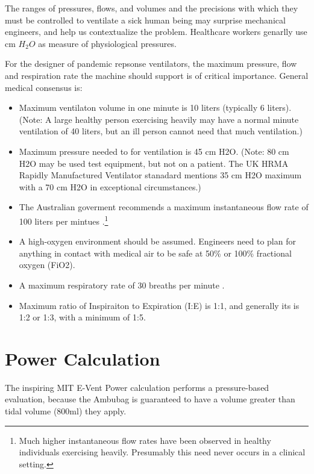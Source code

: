\documentclass[conference]{article}
\begin{document}
The ranges of pressures, flows, and volumes and the precisions with which
they must be controlled to ventilate a sick human being may surprise
mechanical engineers, and help us contextualize the problem.
Healthcare workers genarlly use cm $H_2O$ as measure of physiological
pressures.

For the designer of pandemic repsonse ventilators, the maximum pressure,
flow and respiration rate the machine should support is of critical importance.
General medical consensus is:
\begin{itemize}
\item Maximum ventilaton volume in one minute is 10 liters (typically 6 liters).
  (Note: A large healthy person exercising heavily may have a normal minute ventilation of 40 liters, but an ill person cannot need that much ventilation.)
\item Maximum pressure needed to for ventilation is 45 cm H2O\cite{de2012large,bein2016standard,australiarequirement}.
  (Note: 80 cm H2O may be used test equipment, but not on a patient.
  The UK HRMA Rapidly Manufactured Ventilator stanadard mentions 35 cm H2O maximum with a 70 cm H2O in exceptional circumstances\cite{rmvs}.)
\item The Australian goverment recommends a maximum instantaneous flow rate of 100 liters per mintues \cite{australiarequirement}.\footnote{Much higher instantaneous flow rates have been observed in healthy individuals exercising heavily. Presumably this need never occurs in a clinical setting.}
\item A high-oxygen environment should be assumed. Engineers need to plan for anything
  in contact with medical air to be safe at 50\% or 100\% fractional oxygen (FiO2).
\item A maximum respiratory rate of 30 breaths per minute \cite{rmvs}.
  \item Maximum ratio of Inspiraiton to Expiration (I:E) is 1:1, and generally its is 1:2 or 1:3, with a minimum of 1:5.
  \end{itemize}



\section{Power Calculation}

The inspiring MIT E-Vent Power calculation\cite{mitpowercalculation} performs
a pressure-based evaluation, because the Ambubag is guaranteed to have a volume greater than tidal volume (800ml) they apply.
\end{document}
